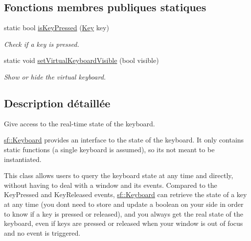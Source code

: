 \subsection*{Fonctions membres publiques statiques}
\begin{DoxyCompactItemize}
\item 
static bool \hyperlink{classsf_1_1Keyboard_a80a04b2f53005886957f49eee3531599}{is\+Key\+Pressed} (\hyperlink{classsf_1_1Keyboard_acb4cacd7cc5802dec45724cf3314a142}{Key} key)
\begin{DoxyCompactList}\small\item\em Check if a key is pressed. \end{DoxyCompactList}\item 
static void \hyperlink{classsf_1_1Keyboard_ad61fee7e793242d444a8c5acd662fe5b}{set\+Virtual\+Keyboard\+Visible} (bool visible)
\begin{DoxyCompactList}\small\item\em Show or hide the virtual keyboard. \end{DoxyCompactList}\end{DoxyCompactItemize}


\subsection{Description détaillée}
Give access to the real-\/time state of the keyboard. 

\hyperlink{classsf_1_1Keyboard}{sf\+::\+Keyboard} provides an interface to the state of the keyboard. It only contains static functions (a single keyboard is assumed), so it\textquotesingle{}s not meant to be instantiated.

This class allows users to query the keyboard state at any time and directly, without having to deal with a window and its events. Compared to the Key\+Pressed and Key\+Released events, \hyperlink{classsf_1_1Keyboard}{sf\+::\+Keyboard} can retrieve the state of a key at any time (you don\textquotesingle{}t need to store and update a boolean on your side in order to know if a key is pressed or released), and you always get the real state of the keyboard, even if keys are pressed or released when your window is out of focus and no event is triggered.

